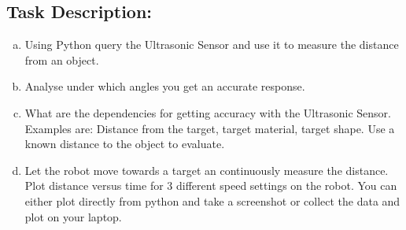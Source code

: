 

\subsection*{\Large Task Description:}
     \begin{enumerate}[a)]
        \item Using Python query the Ultrasonic Sensor and use it to measure the distance from an object. 
     
        \item Analyse under which angles you get an accurate response. 
        
        \item What are the dependencies for getting accuracy with the Ultrasonic Sensor. Examples are: Distance from the target, target material, target shape. Use a known distance to the object to evaluate.
        
        \item Let the robot move towards a target an continuously measure the distance. Plot distance versus time for 3 different speed settings on the robot. You can either plot directly from python and take a screenshot or collect the data and plot on your laptop.  
        
    \end{enumerate}